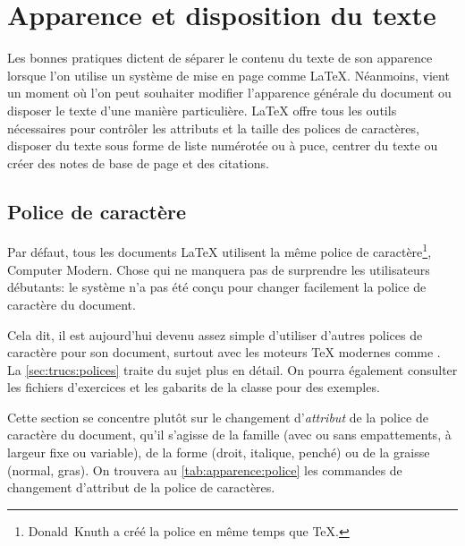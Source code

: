\chapter{Apparence et disposition du texte}
\label{chap:apparence}


Les bonnes pratiques dictent de séparer le contenu du texte de son
apparence lorsque l'on utilise un système de mise en page comme
{\LaTeX}. Néanmoins, vient un moment où l'on peut souhaiter modifier
l'apparence générale du document ou disposer le texte d'une manière
particulière. {\LaTeX} offre tous les outils nécessaires pour
contrôler les attributs et la taille des polices de caractères,
disposer du texte sous forme de liste numérotée ou à puce, centrer du
texte ou créer des notes de base de page et des citations.

\section{Police de caractère}
\label{sec:apparence:police}

Par défaut, tous les documents {\LaTeX} utilisent la même police de
caractère\footnote{%
  Donald~Knuth a créé la police en même temps que {\TeX}.}, %
{\selectfont Computer Modern}. Chose qui ne manquera
pas de surprendre les utilisateurs débutants: le système n'a pas été
conçu pour changer facilement la police de caractère du document.

Cela dit, il est aujourd'hui devenu assez simple d'utiliser d'autres
polices de caractère pour son document, surtout avec les moteurs
{\TeX} modernes comme {\XeTeX}. La \autoref{sec:trucs:polices} traite
du sujet plus en détail. On pourra également consulter les fichiers
d'exercices et les gabarits de la classe  pour des
exemples.

Cette section se concentre plutôt sur le changement d'\emph{attribut}
de la police de caractère du document, qu'il s'agisse de la famille
(avec ou sans empattements, à largeur fixe ou variable), de la forme
(droit, italique, penché) ou de la graisse (normal, gras). On trouvera
au \autoref{tab:apparence:police} les commandes de changement
d'attribut de la police de caractères.

